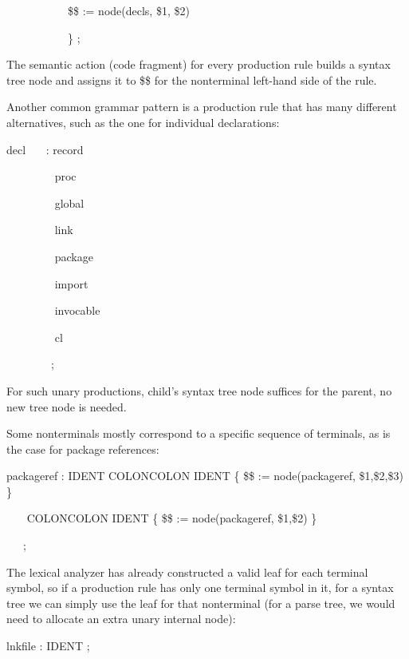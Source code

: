 {\ttfamily\mdseries
\ \ \ \ \ \ \ \ \ \ \ \$\$ := node({\textquotedbl}decls{\textquotedbl}, \$1, \$2)}

{\ttfamily\mdseries
\ \ \ \ \ \ \ \ \ \ \ \} ;}


The {\textquotedbl}semantic action{\textquotedbl} (code fragment) for
every production rule builds a syntax tree node and assigns it to \$\$
for the nonterminal left-hand side of the rule.

Another common grammar pattern is a production rule that has many
different alternatives, such as the one for individual declarations:

{\ttfamily\mdseries
decl \ \ \ : record}

{\ttfamily\mdseries
\ \ \ \ \ \ \ \ {\textbar} proc}

{\ttfamily\mdseries
\ \ \ \ \ \ \ \ {\textbar} global}

{\ttfamily\mdseries
\ \ \ \ \ \ \ \ {\textbar} link}

{\ttfamily\mdseries
\ \ \ \ \ \ \ \ {\textbar} package}

{\ttfamily\mdseries
\ \ \ \ \ \ \ \ {\textbar} import}

{\ttfamily\mdseries
\ \ \ \ \ \ \ \ {\textbar} invocable}

{\ttfamily\mdseries
\ \ \ \ \ \ \ \ {\textbar} cl}

{\ttfamily\mdseries
\ \ \ \ \ \ \ \ ;}


For such {\textquotedbl}unary{\textquotedbl} productions, child's
syntax tree node suffices for the parent, no new tree node is needed.

Some nonterminals mostly correspond to a specific sequence of
terminals, as is the case for package references:

{\ttfamily\mdseries
packageref : IDENT COLONCOLON IDENT \{ \$\$ := node({\textquotedbl}packageref{\textquotedbl}, \$1,\$2,\$3) \} }

{\ttfamily\mdseries
\ \ \ {\textbar} COLONCOLON IDENT \{ \$\$ := node({\textquotedbl}packageref{\textquotedbl}, \$1,\$2) \} \ }

{\ttfamily\mdseries
\ \ \ ;}


The lexical analyzer has already constructed a valid
{\textquotedbl}leaf{\textquotedbl} for each terminal symbol, so if a
production rule has only one terminal symbol in it, for a syntax tree
we can simply use the leaf for that nonterminal (for a parse tree, we
would need to allocate an extra unary internal node):

{\ttfamily\mdseries
lnkfile : IDENT ;}

